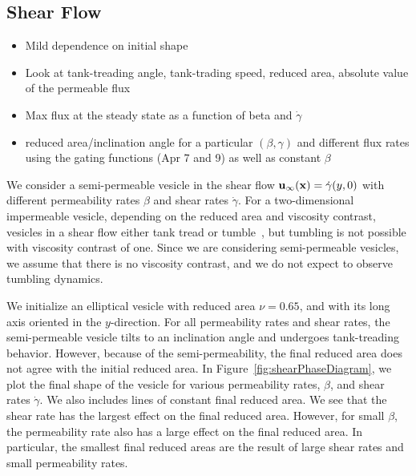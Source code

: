 \documentclass[9pt,twocolumn,twoside,lineno]{pnas-new}
\begin{document}
\subsection*{Shear Flow}
\begin{itemize}
  \item Mild dependence on initial shape

  \item Look at tank-treading angle, tank-trading speed, reduced area,
    absolute value of the permeable flux

  \item Max flux at the steady state as a function of beta and
    $\dot{\gamma}$

  \item reduced area/inclination angle for a particular $(\beta,\gamma)$
    and different flux rates using the gating functions (Apr 7 and 9) as
    well as constant $\beta$
\end{itemize}

We consider a semi-permeable vesicle in the shear flow
$\mathbf{u}_{\infty}(\mathbf{x}) = \dot{\gamma} (y,0)$ with different permeability
rates $\beta$ and shear rates $\dot{\gamma}$.  For a two-dimensional
impermeable vesicle, depending on the reduced area and viscosity
contrast, vesicles in a shear flow either tank tread or
tumble~\cite{fin-lam-sei-gom2008,kra-win-sei-lip1996}, but tumbling is
not possible with viscosity contrast of one. Since we are considering
semi-permeable vesicles, we assume that there is no viscosity contrast,
and we do not expect to observe tumbling dynamics.

We initialize an elliptical vesicle with reduced area $\nu = 0.65$, and
with its long axis oriented in the $y$-direction. For all permeability
rates and shear rates, the semi-permeable vesicle tilts to an
inclination angle and undergoes tank-treading behavior. However, because
of the semi-permeability, the final reduced area does not agree with the
initial reduced area. In Figure~\ref{fig:shearPhaseDiagram}, we plot the
final shape of the vesicle for various permeability rates, $\beta$, and
shear rates $\dot{\gamma}$. We also includes lines of constant final
reduced area. We see that the shear rate has the largest effect on the
final reduced area. However, for small $\beta$, the permeability rate
also has a large effect on the final reduced area. In particular, the
smallest final reduced areas are the result of large shear rates and
small permeability rates.
\end{document}
